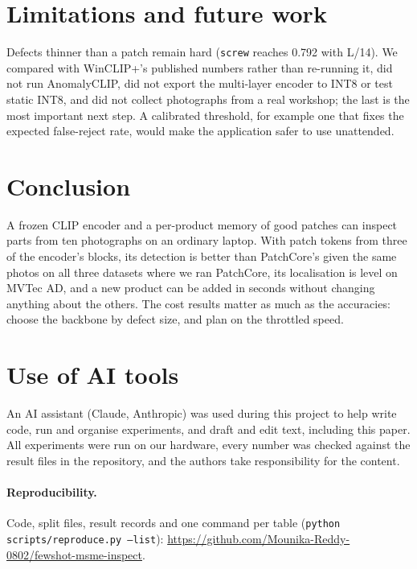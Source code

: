 \documentclass[10pt,twocolumn]{article}
\begin{document}
\section{Limitations and future work}
Defects thinner than a patch remain hard (\texttt{screw} reaches 0.792 with L/14).
We compared with WinCLIP+'s published numbers rather than re-running it, did
not run AnomalyCLIP, did not export the multi-layer encoder to INT8 or test static
INT8, and did not collect photographs from a real workshop; the last is the most
important next step. A
calibrated threshold, for example one that fixes the expected false-reject rate,
would make the application safer to use unattended.

\section{Conclusion}
A frozen CLIP encoder and a per-product memory of good patches can inspect parts
from ten photographs on an ordinary laptop. With patch tokens from three of the
encoder's blocks, its detection is better than PatchCore's given the same photos
on all three datasets where we ran PatchCore, its localisation is level on MVTec
AD, and a new product can be added in seconds without changing anything about the
others. The cost results matter as much as the
accuracies: choose the backbone by defect size, and plan on the throttled speed.

\section*{Use of AI tools}
An AI assistant (Claude, Anthropic) was used during this project to help write
code, run and organise experiments, and draft and edit text, including this paper.
All experiments were run on our hardware, every number was checked against the
result files in the repository, and the authors take responsibility for the
content.

\paragraph{Reproducibility.} Code, split files, result records and one command per
table (\texttt{python scripts/reproduce.py --list}):
\url{https://github.com/Mounika-Reddy-0802/fewshot-msme-inspect}.



\end{document}

